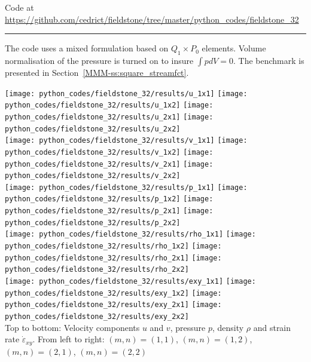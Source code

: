 

\begin{center}
Code at \url{https://github.com/cedrict/fieldstone/tree/master/python_codes/fieldstone_32}
\end{center}

\par\noindent\rule{\textwidth}{0.4pt}


The code uses a mixed formulation based on $Q_1 \times P_0$ elements.
Volume normalisation of the pressure is turned on to insure $\int p dV = 0$. 
The benchmark is presented in Section~\ref{MMM-ss:square_streamfct}.

\begin{center}
\texttt{[image: python\_codes/fieldstone\_32/results/u\_1x1]}
\texttt{[image: python\_codes/fieldstone\_32/results/u\_1x2]}
\texttt{[image: python\_codes/fieldstone\_32/results/u\_2x1]}
\texttt{[image: python\_codes/fieldstone\_32/results/u\_2x2]}\\
\texttt{[image: python\_codes/fieldstone\_32/results/v\_1x1]}
\texttt{[image: python\_codes/fieldstone\_32/results/v\_1x2]}
\texttt{[image: python\_codes/fieldstone\_32/results/v\_2x1]}
\texttt{[image: python\_codes/fieldstone\_32/results/v\_2x2]}\\
\texttt{[image: python\_codes/fieldstone\_32/results/p\_1x1]}
\texttt{[image: python\_codes/fieldstone\_32/results/p\_1x2]}
\texttt{[image: python\_codes/fieldstone\_32/results/p\_2x1]}
\texttt{[image: python\_codes/fieldstone\_32/results/p\_2x2]}\\
\texttt{[image: python\_codes/fieldstone\_32/results/rho\_1x1]}
\texttt{[image: python\_codes/fieldstone\_32/results/rho\_1x2]}
\texttt{[image: python\_codes/fieldstone\_32/results/rho\_2x1]}
\texttt{[image: python\_codes/fieldstone\_32/results/rho\_2x2]}\\
\texttt{[image: python\_codes/fieldstone\_32/results/exy\_1x1]}
\texttt{[image: python\_codes/fieldstone\_32/results/exy\_1x2]}
\texttt{[image: python\_codes/fieldstone\_32/results/exy\_2x1]}
\texttt{[image: python\_codes/fieldstone\_32/results/exy\_2x2]}\\
{\captionfont Top to bottom: Velocity components $u$ and $v$, pressure $p$, density $\rho$ and 
strain rate $\dot \varepsilon_{xy}$. 
From left to right: $(m,n)=(1,1)$, $(m,n)=(1,2)$, $(m,n)=(2,1)$, $(m,n)=(2,2)$ }
\end{center}


